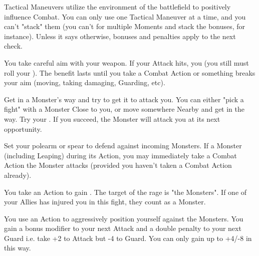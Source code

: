   Tactical Maneuvers utilize the environment of the battlefield to positively influence Combat. You can only use one Tactical Maneuver at a time, and you can't "stack" them (you can't  for multiple Moments and stack the bonuses, for instance). Unless it says otherwise, bonuses and penalties apply to the next \RO check.


\begin{multicols*}{2}


  \COMBAT [
    Name = Aim,
    Link = combat-tactical-maneuver-aim,
    Desc = Shoot or Throw Weapons Only
  ]
  
  You take careful aim with your weapon.  If your  Attack \RO hits, you  (you still must roll your \FOC). The benefit lasts until you take a Combat Action or something breaks your aim (moving, taking damaging, Guarding, etc).

  \COMBAT [
    Name = Block,
    Link = combat-tactical-maneuver-block,
    Desc = Brawl weapons only
  ]

  Get in a Monster's way and try to get it to attack you.  You can either "pick a fight" with a Monster Close to you, or move somewhere Nearby and get in the way. Try your \RSTRY{\PRE}.  If you succeed, the Monster will attack you at its next opportunity.

  \COMBAT [
    Name = Brace,
    Link = combat-tactical-maneuver-brace,
    Desc = Polearm or spear only
  ]

  Set your polearm or spear to defend against incoming Monsters.  If a Monster  (including Leaping) during its Action, you may immediately take a Combat Action  the Monster attacks (provided you haven't taken a Combat Action already).

\cbreak

  \COMBAT [
    Name = Rage,
    Link = combat-tactical-maneuver-rage,
    Desc = Brawl weapons only
  ]

  You take an Action to gain .  The target of the rage is "the Monsters". If one of your Allies has injured you in this fight, they count as a Monster.

  \COMBAT [
    Name = Reckless,
    Link = combat-tactical-maneuver-reckless,
    Desc = Brawl weapons only
  ]

  You use an Action to aggressively position yourself against the Monsters.  You gain a bonus modifier to your next Attack \RO and a double penalty to your next Guard \RO i.e. take +2 to Attack but -4 to Guard.  You can only gain up to +4/-8 in this way.


\end{multicols*}
